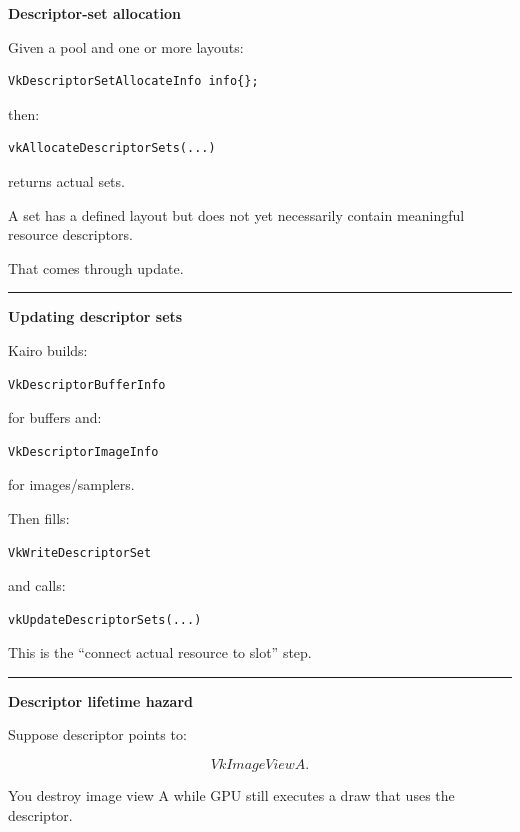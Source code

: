 \textbf{Descriptor-set allocation}

Given a pool and one or more layouts:

\begin{verbatim}
VkDescriptorSetAllocateInfo info{};
\end{verbatim}

then:

\begin{verbatim}
vkAllocateDescriptorSets(...)
\end{verbatim}

returns actual sets.

A set has a defined layout but does not yet necessarily contain meaningful resource descriptors.

That comes through update.

\begin{center}\rule{0.5\linewidth}{0.5pt}\end{center}

\textbf{Updating descriptor sets}

Kairo builds:

\begin{verbatim}
VkDescriptorBufferInfo
\end{verbatim}

for buffers and:

\begin{verbatim}
VkDescriptorImageInfo
\end{verbatim}

for images/samplers.

Then fills:

\begin{verbatim}
VkWriteDescriptorSet
\end{verbatim}

and calls:

\begin{verbatim}
vkUpdateDescriptorSets(...)
\end{verbatim}

This is the ``connect actual resource to slot'' step.

\begin{center}\rule{0.5\linewidth}{0.5pt}\end{center}

\textbf{Descriptor lifetime hazard}

Suppose descriptor points to:

\[
VkImageView A.
\]

You destroy image view A while GPU still executes a draw that uses the descriptor.

